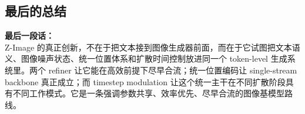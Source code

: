 \subsection{最后的总结}

\begin{conceptbox}
\textbf{最后一段话：}\\
Z-Image 的真正创新，不在于把文本接到图像生成器前面，而在于它试图把文本语义、图像噪声状态、统一位置体系和扩散时间控制放进同一个 token-level 生成系统里。两个 refiner 让它能在高效前提下尽早合流；统一位置编码让 single-stream backbone 真正成立；而 timestep modulation 让这个统一主干在不同扩散阶段具有不同工作模式。它是一条强调参数共享、效率优先、尽早合流的图像基模型路线。
\end{conceptbox}
